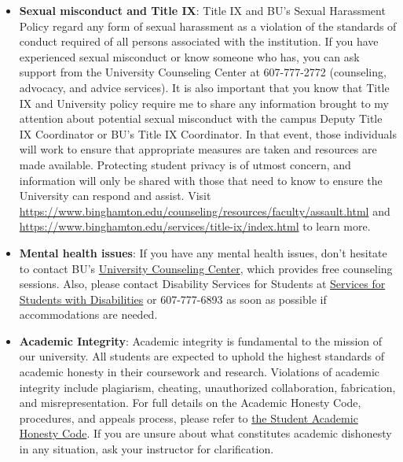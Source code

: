 \documentclass[11pt, a4paper]{article}
\begin{document}
\begin{itemize}
    \item \textbf{Sexual misconduct and Title IX}: Title IX and BU’s Sexual Harassment Policy regard any form of sexual harassment as a violation of the standards of conduct required of all persons associated with the institution. If you have experienced sexual misconduct or know someone who has, you can ask support from the University Counseling Center at 607-777-2772 (counseling, advocacy, and advice services). It is also important that you know that Title IX and University policy require me to share any information brought to my attention about potential sexual misconduct with the campus Deputy Title IX Coordinator or BU’s Title IX Coordinator. In that event, those individuals will work to ensure that appropriate measures are taken and resources are made available. Protecting student privacy is of utmost concern, and information will only be shared with those that need to know to ensure the University can respond and assist. Visit \url{https://www.binghamton.edu/counseling/resources/faculty/assault.html} and \url{https://www.binghamton.edu/services/title-ix/index.html} to learn more.
    \item \textbf{Mental health issues}: If you have any mental health issues, don’t hesitate to contact BU’s \href{https://www.binghamton.edu/counseling/index.html}{University Counseling Center}, which provides free counseling sessions. Also, please contact Disability Services for Students at \href{https://www.binghamton.edu/ssd/index.html}{Services for Students with Disabilities} or 607-777-6893 as soon as possible if accommodations are needed.
    \item \textbf{Academic Integrity}: Academic integrity is fundamental to the mission of our university. All students are expected to uphold the highest standards of academic honesty in their coursework and research. Violations of academic integrity include plagiarism, cheating, unauthorized collaboration, fabrication, and misrepresentation. For full details on the Academic Honesty Code, procedures, and appeals process, please refer to \href{https://www.binghamton.edu/watson/about/academic-honesty.html}{the Student Academic Honesty Code}. If you are unsure about what constitutes academic dishonesty in any situation, ask your instructor for clarification.
\end{itemize}

\end{document}
